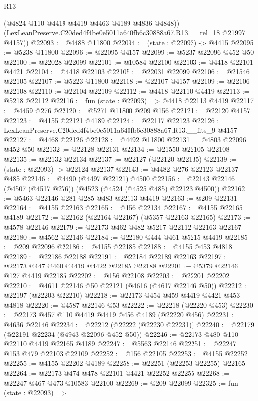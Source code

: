 \begin{lexlean}{R13}
\begin{coremodule}
        (@4824 @110 @4419 @4419 @4463 @4189 @4836 @4848))
      (LexLeanPreserve.C20ded4f4be0e5011a640fb6c30888a67.R13.__rel_18 @21997 @4157))
@22093 := @4488 @11800
@22094 := (state : @22093) -> @4415
@22095 := @5238 @11800
@22096 := @22095 @4157
@22099 := @5237 @22096 @452 @50
@22100 := @22028 @22099
@22101 := @10584 @22100
@22103 := @4418 @22101 @4421
@22104 := @4418 @22103
@22105 := @22031 @22099
@22106 := @21546 @22105
@22107 := @5223 @11800
@22108 := @22107 @4157
@22109 := @22106 @22108
@22110 := @22104 @22109
@22112 := @4418 @22110 @4419
@22113 := @5218 @22112
@22116 := fun (state : @22093) => @4418 @22113 @4419
@22117 := @4459 @276
@22120 := @5271 @11800 @209 @156
@22121 := @22120 @4157
@22123 := @4155 @22121 @4189
@22124 := @22117 @22123
@22126 := LexLeanPreserve.C20ded4f4be0e5011a640fb6c30888a67.R13.__fits_9 @4157
@22127 := @4468 @22126
@22128 := @4492 @11800
@22131 := @4803 @22096 @452 @50
@22132 := @22128 @22131
@22134 := @21550 @22105 @22108
@22135 := @22132 @22134
@22137 := @22127 (@22120 @22135)
@22139 := (state : @22093) -> @22124 @22137
@22143 := @4482 @276 @22123 @22137 @485
@22146 := @4490 (@4497 @22121) @4500
@22156 := @22143 @22146 (@4507 (@4517 @276)) (@4523 (@4524 (@4525 @485) @22123 @4500))
@22162 := @5463 @22146 @281 @285 @483 @22113 @4419
@22163 := @209 @22131
@22164 := @4155 @22163
@22165 := @156 @22134
@22167 := @4155 @22165 @4189
@22172 := @22162 (@22164 @22167) (@5357 @22163 @22165)
@22173 := @4578 @22146
@22179 := @22173 @462 @482 @5217 @22112 @22163 @22167
@22180 := @4562 @22146
@22184 := @22180 @444 @461 @5215 @4419
@22185 := @209 @22096
@22186 := @4155 @22185
@22188 := @4155 @453 @4818
@22189 := @22186 @22188
@22191 := @22184 @22189 @22163
@22197 := @22173 @447 @460 @4419 @4422 @22185 @22188
@22201 := @5379 @22146 @127 @4419 @22185
@22202 := @156 @22108
@22203 := @22201 @22202
@22210 := @4611 @22146 @50 @22121 (@4616 (@4617 @22146 @50))
@22212 := @22197 (@22203 @22210)
@22218 := @22173 @454 @459 @4419 @4421 @453 @4818
@22220 := @4587 @22146 @53
@22222 := @22218 (@22220 @453)
@22230 := @22173 @457 @110 @4419 @4419 @456 @4189 (@22220 @456)
@22231 := @4636 @22146
@22234 := @22212 (@22222 (@22230 @22231))
@22240 := @22179 (@22191 @22234 (@4943 @22096 @452 @50))
@22246 := @22173 @480 @110 @22110 @4419 @22165 @4189
@22247 := @5563 @22146
@22251 := @22247 @153 @479 @22103 @22109
@22252 := @156 @22105
@22253 := @4155 @22252
@22255 := @4155 @22202 @4189
@22258 := @22251 (@22253 @22255) @22165
@22264 := @22173 @474 @478 @22101 @4421 @22252 @22255
@22268 := @22247 @467 @473 @10583 @22100
@22269 := @209 @22099
@22325 := fun (state : @22093) =>

\end{coremodule}
\end{lexlean}
